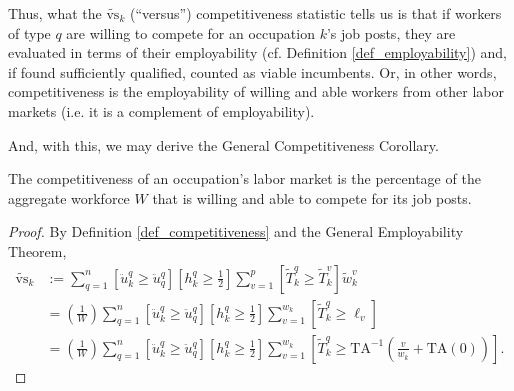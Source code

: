 \documentclass[hidelinks, nonatbib]{elsarticle}
\begin{document}
\begin{definition}[Competitiveness]
    Thus, what the $\tilde{\text{vs}}_{k}$ (``versus'') competitiveness statistic tells us is that if workers of type $q$ are willing to compete for an occupation $k$'s job posts, they are evaluated in terms of their employability (cf. Definition \ref{def_employability}) and, if found sufficiently qualified, counted as viable incumbents. Or, in other words, competitiveness is the employability of willing and able workers from other labor markets (i.e. it is a complement of employability).
\end{definition}

And, with this, we may derive the General Competitiveness Corollary.
\begin{corollary}
    \label{gcc}
    The competitiveness of an occupation's labor market is the percentage of the aggregate workforce $W$ that is willing and able to compete for its job posts.

    \begin{proof}
        By Definition \ref{def_competitiveness} and the General Employability Theorem,
        \begin{align}
            \tilde{\text{vs}}_k 
            &:=
            \sum_{q=1}^{n}
            \left[
                \ddot{u}_{k}^{q}
                \geq
                \ddot{u}_{q}^{q}
            \right]
            \left[
                h_{k}^{q}
                \geq
                \frac{1}{2}
            \right]
            \sum_{v=1}^{p}
            \left[
                \tilde{T}_{k}^{q}
                \geq
                \tilde{T}_{k}^{v}
            \right]
            \tilde{w}_{k}^{v}
            \\
            &=
            \left(
                \frac{1}{W}
            \right)
            \sum_{q=1}^{n}
            \left[
                \ddot{u}_{k}^{q}
                \geq
                \ddot{u}_{q}^{q}
            \right]
            \left[
                h_{k}^{q}
                \geq
                \frac{1}{2}
            \right]
            \sum_{v=1}^{w_k}
            \left[
                \tilde{T}_{k}^{q}
                \geq
                \ell_v
            \right]
            \\
            &=
            \left(
                \frac{1}{W}
            \right)
            \sum_{q=1}^{n}
            \left[
                \ddot{u}_{k}^{q}
                \geq
                \ddot{u}_{q}^{q}
            \right]
            \left[
                h_{k}^{q}
                \geq
                \frac{1}{2}
            \right]
            \sum_{v=1}^{w_k}
            \left[
                \tilde{T}_{k}^{q}
                \geq
                \text{TA}^{-1}
                \left(
                    \frac{v}{w_k}
                    +
                    \text{TA}(0)
                \right)
            \right]
            .
        \end{align}
    \end{proof}
\end{corollary}
\end{document}
